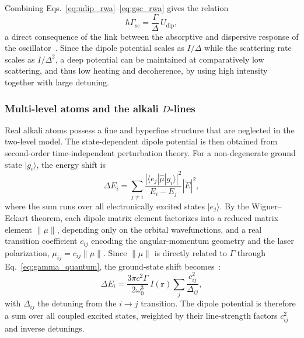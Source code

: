Combining Eqs.~\ref{eq:udip_rwa}--\ref{eq:gsc_rwa} gives the relation
\begin{equation}
\hbar\Gamma_{\mathrm{sc}} = \frac{\Gamma}{\Delta}\,U_{\mathrm{dip}},
\label{eq:scattering_vs_potential}
\end{equation}
a direct consequence of the link between the absorptive and dispersive response of the oscillator~\cite{Grimm:00}. Since the dipole potential scales as $I/\Delta$ while the scattering rate scales as $I/\Delta^2$, a deep potential can be maintained at comparatively low scattering, and thus low heating and decoherence, by using high intensity together with large detuning. 

\subsubsection{Multi-level atoms and the alkali \texorpdfstring{$D$}{D}-lines}

Real alkali atoms possess a fine and hyperfine structure that are neglected in the two-level model. The state-dependent dipole potential is then obtained from second-order time-independent perturbation theory. For a non-degenerate ground state $|g_i\rangle$, the energy shift is~\cite{Grimm:00}
\begin{equation}
\Delta E_i = \sum_{j\neq i}\frac{|\langle e_j|\hat{\mu}|g_i\rangle|^2}{E_i - E_j}|\tilde{E}|^2,
\label{eq:perturbation_general}
\end{equation}
where the sum runs over all electronically excited states $|e_j\rangle$. By the Wigner--Eckart theorem, each dipole matrix element factorizes into a reduced matrix element $\|\mu\|$, depending only on the orbital wavefunctions, and a real transition coefficient $c_{ij}$ encoding the angular-momentum geometry and the laser polarization, $\mu_{ij} = c_{ij}\|\mu\|$. Since $\|\mu\|$ is directly related to $\Gamma$ through Eq.~\ref{eq:gamma_quantum}, the ground-state shift becomes~\cite{Grimm:00}:
\begin{equation}
\Delta E_i = \frac{3\pi c^2\Gamma}{2\omega_0^3}\,I(\mathbf{r})\sum_j \frac{c_{ij}^2}{\Delta_{ij}},
\label{eq:perturbation_sum}
\end{equation}
with $\Delta_{ij}$ the detuning from the $i\to j$ transition. The dipole potential is therefore a sum over all coupled excited states, weighted by their line-strength factors $c_{ij}^2$ and inverse detunings.

